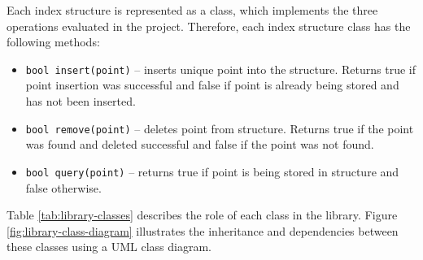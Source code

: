 Each index structure is represented as a class, which implements the three operations evaluated in the project. Therefore, each index structure class has the following methods:
\begin{itemize}
	\item \texttt{bool insert(point)} -- inserts unique point into the structure. Returns true if point insertion was successful and false if point is already being stored and has not been inserted.
	\item \texttt{bool remove(point)} -- deletes point from structure. Returns true if the point was found and deleted successful and false if the point was not found.
	\item \texttt{bool query(point)} -- returns true if point is being stored in structure and false otherwise.
\end{itemize}

Table \ref{tab:library-classes} describes the role of each class in the library. Figure \ref{fig:library-class-diagram} illustrates the inheritance and dependencies between these classes using a UML class diagram.

